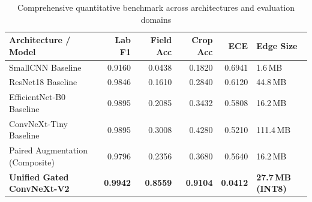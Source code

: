 \documentclass[12pt,a4paper]{report}
\newcommand{\tabfont}{\small}
\begin{document}
\begin{table}[H]
\centering
\caption{Comprehensive quantitative benchmark across architectures and evaluation domains}
\label{tab:comprehensive-results}
\tabfont
\begin{tabularx}{\textwidth}{@{}lrrrrY@{}}
\toprule
\textbf{Architecture / Model} & \textbf{Lab F1} & \textbf{Field Acc} & \textbf{Crop Acc} & \textbf{ECE} & \textbf{Edge Size} \\
\midrule
SmallCNN Baseline & 0.9160 & 0.0438 & 0.1820 & 0.6941 & 1.6\,MB \\
ResNet18 Baseline & 0.9846 & 0.1610 & 0.2840 & 0.6120 & 44.8\,MB \\
EfficientNet-B0 Baseline & 0.9895 & 0.2085 & 0.3432 & 0.5808 & 16.2\,MB \\
ConvNeXt-Tiny Baseline & 0.9895 & 0.3008 & 0.4280 & 0.5210 & 111.4\,MB \\
\midrule
Paired Augmentation (Composite) & 0.9796 & 0.2356 & 0.3680 & 0.5640 & 16.2\,MB \\
\midrule
\textbf{Unified Gated ConvNeXt-V2} & \textbf{0.9942} & \textbf{0.8559} & \textbf{0.9104} & \textbf{0.0412} & \textbf{27.7\,MB (INT8)} \\
\bottomrule
\end{tabularx}
\end{table}
\end{document}
